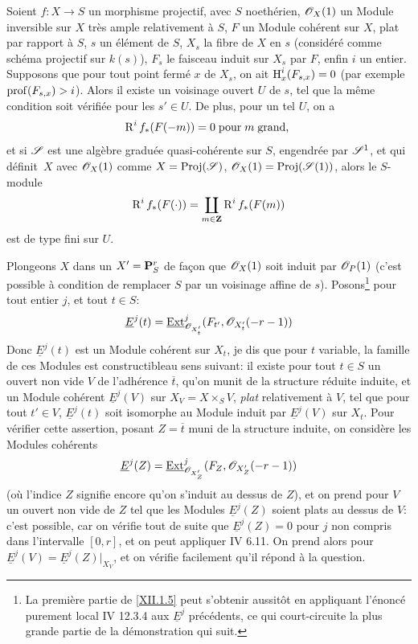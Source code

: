 \begin{proposition} \label{XII.1.5}
Soient $f:X\to S$ un morphisme projectif, avec $S$ noeth\'erien, $\mathscr{O}_X(1)$ un Module inversible sur $X$ tr\`es ample relativement \`a $S$, $F$ un Module coh\'erent sur $X$, plat par rapport \`a $S$, $s$ un \'el\'ement de $S$, $X_s$ la fibre de $X$ en $s$ (consid\'er\'e comme sch\'ema projectif sur $k(s)$), $F_s$ le faisceau induit sur $X_s$ par $F$, enfin $i$ un entier. Supposons que pour tout point ferm\'e $x$ de $X_s$, on ait $\operatorname{H}^i_x(F_{s, x})=0$ (par exemple $\operatorname{prof}(F_{s, x})>i$). Alors il existe un voisinage ouvert $U$ de $s$, tel que la m\^eme condition soit v\'erifi\'ee pour les $s'\in U$. De plus, pour un tel $U$, on a
\[
\operatorname{R}^if_\ast(F(-m))= 0 \; \text{pour}\; m \; \text{grand, }
\]
et si ${\mathscr S}$ est une alg\`ebre gradu\'ee quasi-coh\'erente sur $S$, engendr\'ee par ${\mathscr S}^1$, et qui d\'efinit~$X$ avec $\mathscr{O}_X(1)$ comme $X=\operatorname{Proj}({\mathscr S})$, $\mathscr{O}_X(1)=\operatorname{Proj}({\mathscr S}(1))$, alors le $S$-module
\[
\operatorname{R}^if_\ast(F(\cdot)) = \coprod_{m\in\mathbf{Z}}\operatorname{R}^if_\ast(F(m))
\]
est de type fini sur $U$.
\end{proposition}

Plongeons $X$ dans un $X'={\mathbf P}_S^r$ de fa\c con que $\mathscr{O}_X(1)$ soit induit par ${\mathscr O}_{P}(1)$ (c'est possible \`a condition de remplacer $S$ par un voisinage affine de $s$). Posons\label{P5}\footnote{La premi\`ere partie de \ref{XII.1.5} peut s'obtenir aussit\^{o}t en appliquant l'\'enonc\'e purement local \EGA IV 12.3.4 aux $\underline{E}^j$ pr\'ec\'edents, ce qui court-circuite la plus grande partie de la d\'emonstration qui suit.} pour tout entier $j$, et tout $t\in S$:
\steco
\begin{equation} \label{eq:XII.7} {}\underline{E}^j(t)= \mathop{\underline{\mathrm{Ext}}}\nolimits^j_{{\mathscr O}_{X'_t}} (F_{t'}, {\mathscr O}_{X'_t}(-r-1))
\end{equation}
Donc $\underline{E}^j(t)$ est un Module coh\'erent sur $X_t$, je dis que pour $t$ variable, la famille de ces Modules est \og constructible\fg au sens suivant: il existe pour tout $t\in S$ un ouvert non vide $V$ de l'adh\'erence $\overline{t}$, qu'on munit de la structure r\'eduite induite, et un Module coh\'erent $\underline{E}^j(V)$ sur $X_V=X\times_SV$, \emph{plat} relativement \`a $V$, tel que pour tout $t'\in V$, $\underline{E}^j(t)$ soit isomorphe au Module induit par $\underline{E}^j(V)$ sur $X_t$. Pour v\'erifier cette assertion, posant $Z=\overline{t}$ muni de la structure induite, on consid\`ere les Modules coh\'erents
\[
\underline{E}^j(Z)= \mathop{\underline{\mathrm{Ext}}}\nolimits^j_{{\mathscr O}_{X'_Z}} (F_Z, {\mathscr O}_{X'_Z}(-r-1))
\]
(o\`u l'indice $Z$ signifie encore qu'on s'induit au dessus de $Z$), et on prend pour $V$ un ouvert non vide de $Z$ tel que les Modules $\underline{E}^j(Z)$ soient plats au dessus de $V$: c'est possible, car on v\'erifie tout de suite que $\underline{E}^j(Z)=0$ pour $j$ non compris dans l'intervalle $[0, r]$, et on peut appliquer  IV 6.11. On prend alors pour $\underline{E}^j(V)=\underline{E}^j(Z)|_{X_V}$, et on v\'erifie facilement qu'il r\'epond \`a la question.

